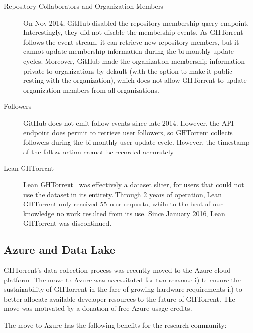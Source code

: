 \documentclass{sig-alternate}
\begin{document}
\begin{description}

  \item[Repository Collaborators and Organization Members] On Nov 2014, GitHub
    disabled the repository membership query endpoint. Interestingly, they did
    not disable the membership events. As GHTorrent follows the event stream, it
    can retrieve new repository members, but it cannot update membership
    information during the bi-monthly update cycles. Moreover, GitHub made the
    organization membership information private to organizations by default
    (with the option to make it public resting with the organization), which
    does not allow GHTorrent to update organization members from all
    organizations.

  \item[Followers] GitHub does not emit follow events since late 2014. However,
    the API endpoint does permit to retrieve user followers, so GHTorrent
    collects followers during the bi-monthly user update cycle. However, the
    timestamp of the follow action cannot be recorded accurately.

  \item[Lean GHTorrent] Lean GHTorrent~\cite{GVSZ14} was effectively a dataset
    slicer, for users that could not use the dataset in its entirety. Through 2
    years of operation, Lean GHTorrent only received 55 user requests, while to
    the best of our knowledge no work resulted from its use. Since January 2016,
    Lean GHTorrent was discontinued.

\end{description}

\subsection{Azure and Data Lake}

GHTorrent's data collection process was recently moved to the Azure cloud
platform. The move to Azure was necessitated for two reasons: i) to ensure the
sustainability of GHTorrent in the face of growing hardware requirements ii) to
better allocate available developer resources to the future of GHTorrent. The
move was motivated by a donation of free Azure usage credits.

The move to Azure has the following benefits for the research community:
\end{document}
